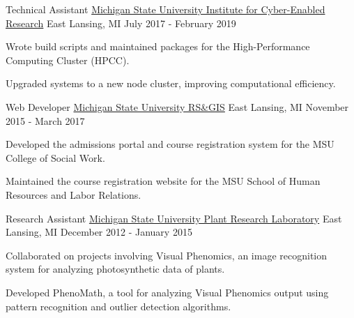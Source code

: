 \begin{cventries}
  \cventry
    {Technical Assistant}
    {\href{https://icer.msu.edu}{Michigan State University Institute for Cyber-Enabled Research}}
    {East Lansing, MI}
    {July 2017 - February 2019}
    {
      \begin{cvitems}
        \item {Wrote build scripts and maintained packages for the High-Performance Computing Cluster (HPCC).}
        \item {Upgraded systems to a new node cluster, improving computational efficiency.}
      \end{cvitems}
    }

  \cventry
    {Web Developer}
    {\href{http://www.rsgis.msu.edu}{Michigan State University RS\&GIS}}
    {East Lansing, MI}
    {November 2015 - March 2017}
    {
      \begin{cvitems}
        \item {Developed the admissions portal and course registration system for the MSU College of Social Work.}
        \item {Maintained the course registration website for the MSU School of Human Resources and Labor Relations.}
      \end{cvitems}
    }

  \cventry
    {Research Assistant}
    {\href{https://prl.natsci.msu.edu/}{Michigan State University Plant Research Laboratory}}
    {East Lansing, MI}
    {December 2012 - January 2015}
    {
      \begin{cvitems}
        \item {Collaborated on projects involving Visual Phenomics, an image recognition system for analyzing photosynthetic data of plants.}
        \item {Developed PhenoMath, a tool for analyzing Visual Phenomics output using pattern recognition and outlier detection algorithms.}
      \end{cvitems}
    }

\end{cventries}
